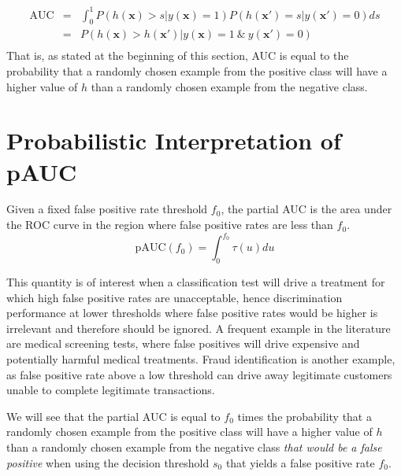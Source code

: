 \begin{equation*}
    \begin{array}{lcl}
    \textrm{AUC} & = & \int_0^1 P\left(h(\mathbf{x}) > s | y(\mathbf{x})=1\right) P\left(h(\mathbf{x}')=s | y(\mathbf{x}') = 0\right) ds \\
      & = & P\left(h(\mathbf{x}) > h(\mathbf{x}') | y(\mathbf{x})=1 \ \& \  y(\mathbf{x}') = 0\right) \\
    \end{array}
\end{equation*}
That is, as stated at the beginning of this section, AUC is equal to the probability that a randomly chosen example from the positive class will have a higher value of $h$ than a randomly chosen example from the negative class.

\section{Probabilistic Interpretation of pAUC}

Given a fixed false positive rate threshold $f_0$, the partial AUC is the area under the ROC curve in the region where false positive rates are less than $f_0$.
\begin{equation} \label{eq:pauc}
     \textrm{pAUC}(f_0) = \int_0^{f_0} \tau(u)du
\end{equation}

This quantity is of interest when a classification test will drive a treatment for which high false positive rates are unacceptable, hence discrimination performance at lower thresholds where false positive rates would be higher is irrelevant and therefore should be ignored.  A frequent example in the literature are medical screening tests, where false positives will drive expensive and potentially harmful medical treatments.  Fraud identification is another example, as false positive rate above a low threshold can drive away legitimate customers unable to complete legitimate transactions.

We will see that the partial AUC is equal to $f_0$ times the probability that a randomly chosen example from the positive class will have a higher value of $h$ than a randomly chosen example from the negative class \textit{that would be a false positive} when using the decision threshold $s_0$ that yields a false positive rate $f_0$.

